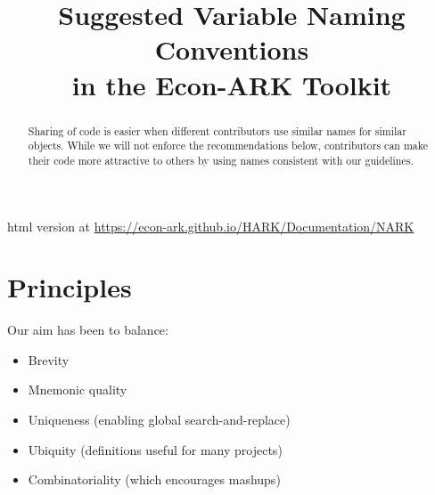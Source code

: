 \documentclass[12pt]{econtex}
\begin{document}



\title{Suggested Variable Naming Conventions \\ in the Econ-ARK Toolkit}



\vspace{2in}



\maketitle 


\begin{abstract}
  Sharing of code is easier when different contributors use similar names for similar objects.  While we will not enforce the
  recommendations below, contributors can make their code more attractive to others 
  by using names consistent with our guidelines.  
\end{abstract}

\centerline{html version at \url{https://econ-ark.github.io/HARK/Documentation/NARK}}



\pagebreak

\section{Principles}
Our aim has been to balance:
\begin{itemize}
\item Brevity 
\item Mnemonic quality
\item Uniqueness (enabling global search-and-replace)
\item Ubiquity (definitions useful for many projects)
\item Combinatoriality (which encourages mashups)
\end{itemize}
\end{document}
